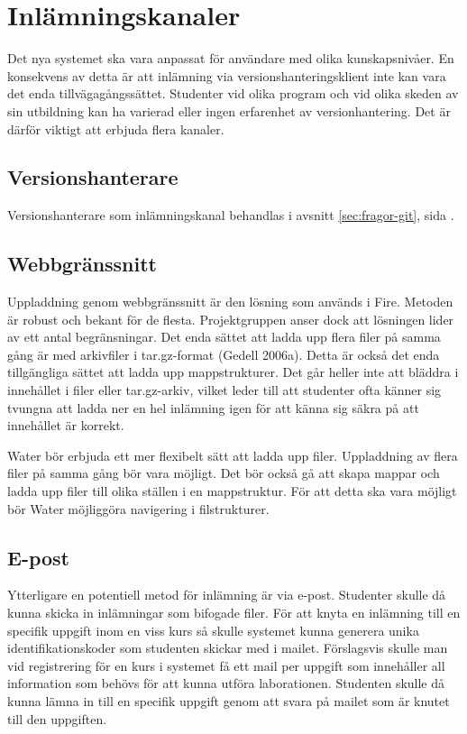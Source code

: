 \section{Inlämningskanaler}

Det nya systemet ska vara anpassat för användare med olika kunskapsnivåer. En konsekvens av detta är att inlämning via versionshanteringsklient inte kan vara det enda tillvägagångssättet. Studenter vid olika program och vid olika skeden av sin utbildning kan ha varierad eller ingen erfarenhet av versionhantering. Det är därför viktigt att erbjuda flera kanaler.

\subsection{Versionshanterare}
Versionshanterare som inlämningskanal behandlas i avsnitt \ref{sec:fragor-git}, sida \pageref{sec:fragor-git}.

\subsection{Webbgränssnitt}
Uppladdning genom webbgränssnitt är den lösning som används i Fire. Metoden är robust och bekant för de flesta. Projektgruppen anser dock att lösningen lider av ett antal begränsningar. Det enda sättet att ladda upp flera filer på samma gång är med arkivfiler i tar.gz-format (Gedell 2006a). Detta är också det enda tillgängliga sättet att ladda upp mappstrukturer. Det går heller inte att bläddra i innehållet i filer eller tar.gz-arkiv, vilket leder till att studenter ofta känner sig tvungna att ladda ner en hel inlämning igen för att känna sig säkra på att innehållet är korrekt.

Water bör erbjuda ett mer flexibelt sätt att ladda upp filer. Uppladdning av flera filer på samma gång bör vara möjligt. Det bör också gå att skapa mappar och ladda upp filer till olika ställen i en mappstruktur. För att detta ska vara möjligt bör Water möjliggöra navigering i filstrukturer.

\subsection{E-post}
Ytterligare en potentiell metod för inlämning är via e-post. Studenter skulle då kunna skicka in inlämningar som bifogade filer. För att knyta en inlämning till en specifik uppgift inom en viss kurs så skulle systemet kunna generera unika identifikationskoder som studenten skickar med i mailet. Förslagsvis skulle man vid registrering för en kurs i systemet få ett mail per uppgift som innehåller all information som behövs för att kunna utföra laborationen. Studenten skulle då kunna lämna in till en specifik uppgift genom att svara på mailet som är knutet till den uppgiften.

